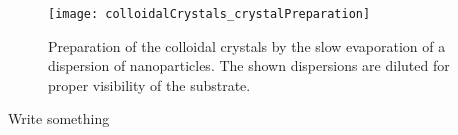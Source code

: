 \documentclass[\main/dresen_thesis.tex]{subfiles}
\begin{document}
  \begin{figure}[tb]
    \centering
    \texttt{[image: colloidalCrystals\_crystalPreparation]}
    \caption{\label{fig:colloidalCrystals:preparation:image}Preparation of the colloidal crystals by the slow evaporation of a dispersion of nanoparticles. The shown dispersions are diluted for proper visibility of the substrate.}
  \end{figure}

  Write something


\end{document}

